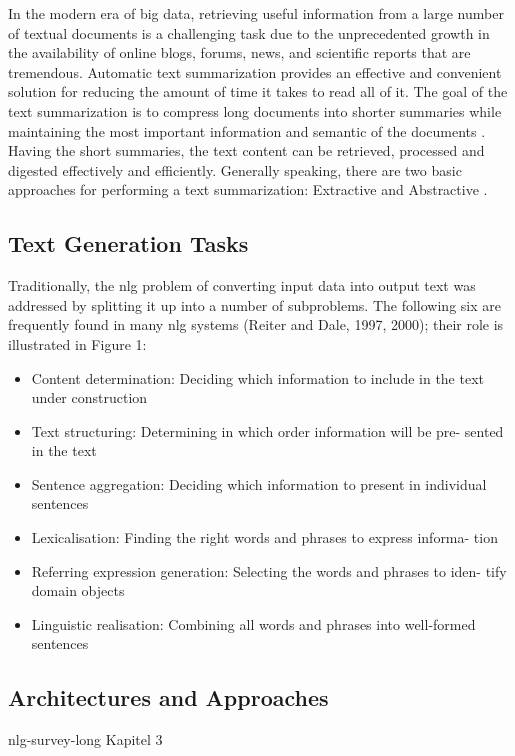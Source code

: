 In the modern era of big data, retrieving useful information from a large number of textual documents is a challenging task due to the unprecedented growth in the availability of online blogs, forums, news, and scientific reports that are tremendous. Automatic text summarization provides an effective and convenient solution for reducing the amount of time it takes to read all of it. The goal of the text summarization is to compress long documents into shorter summaries while maintaining the most important information and semantic of the documents \cite{ts-intro} \cite{ts-intro2}. Having the short summaries, the text content can be retrieved, processed and digested effectively and efficiently. 
Generally speaking, there are two basic approaches for performing a text summarization: Extractive and Abstractive \cite{ts-intro3}. 

\subsection{Text Generation Tasks}
Traditionally, the nlg problem of converting input data into output text was addressed by splitting it up into a number of subproblems. The following six are frequently found in many nlg systems (Reiter and Dale, 1997, 2000); their role is illustrated in Figure 1:
\begin{itemize}
	\item Content determination: Deciding which information to include in the text under construction
	\item Text structuring: Determining in which order information will be pre- sented in the text
	\item Sentence aggregation: Deciding which information to present in individual sentences
	\item Lexicalisation: Finding the right words and phrases to express informa- tion
	\item Referring expression generation: Selecting the words and phrases to iden- tify domain objects
	\item Linguistic realisation: Combining all words and phrases into well-formed sentences
\end{itemize}

\subsection{Architectures and Approaches}

nlg-survey-long Kapitel 3

